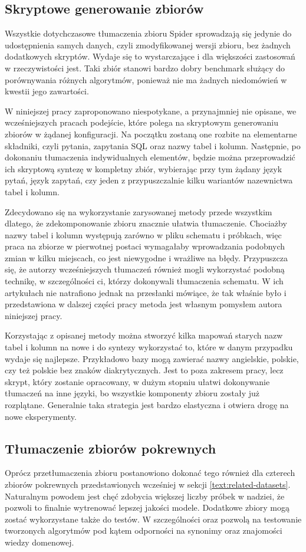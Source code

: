\subsection{Skryptowe generowanie zbiorów}
Wszystkie dotychczasowe tłumaczenia zbioru Spider sprowadzają się jedynie do udostępnienia samych danych, czyli zmodyfikowanej wersji zbioru, bez żadnych dodatkowych skryptów. Wydaje się to wystarczające i dla większości zastosowań w rzeczywistości jest. Taki zbiór stanowi bardzo dobry benchmark służący do porównywania różnych algorytmów, ponieważ nie ma żadnych niedomówień w kwestii jego zawartości.

W niniejszej pracy zaproponowano niespotykane, a przynajmniej nie opisane, we wcześniejszych pracach podejście, które polega na skryptowym generowaniu zbiorów w żądanej konfiguracji. Na początku zostaną one rozbite na elementarne składniki, czyli pytania, zapytania SQL oraz nazwy tabel i kolumn. Następnie, po dokonaniu tłumaczenia indywidualnych elementów, będzie można przeprowadzić ich skryptową syntezę w kompletny zbiór, wybierając przy tym żądany język pytań, język zapytań, czy jeden z przypuszczalnie kilku wariantów nazewnictwa tabel i kolumn. 

Zdecydowano się na wykorzystanie zarysowanej metody przede wszystkim dlatego, że zdekomponowanie zbioru znacznie ułatwia tłumaczenie. Chociażby nazwy tabel i kolumn występują zarówno w pliku schematu i próbkach, więc praca na zbiorze w pierwotnej postaci wymagałaby wprowadzania podobnych zmian w kilku miejscach, co jest niewygodne i wrażliwe na błędy. Przypuszcza się, że autorzy wcześniejszych tłumaczeń również mogli wykorzystać podobną technikę, w szczególności ci, którzy dokonywali tłumaczenia schematu. W ich artykułach nie natrafiono jednak na przesłanki mówiące, że tak właśnie było i przedstawiona w dalszej części pracy metoda jest własnym pomysłem autora niniejszej pracy.

Korzystając z opisanej metody można stworzyć kilka mapowań starych nazw tabel i kolumn na nowe i do syntezy wykorzystać to, które w danym przypadku wydaje się najlepsze. Przykładowo bazy mogą zawierać nazwy angielskie, polskie, czy też polskie bez znaków diakrytycznych. Jest to poza zakresem pracy, lecz skrypt, który zostanie opracowany, w dużym stopniu ułatwi dokonywanie tłumaczeń na inne języki, bo wszystkie komponenty zbioru  zostały już rozplątane. Generalnie taka strategia jest bardzo elastyczna i otwiera drogę na nowe eksperymenty.

\subsection{Tłumaczenie zbiorów pokrewnych}
Oprócz przetłumaczenia zbioru  postanowiono dokonać tego również dla czterech zbiorów pokrewnych przedstawionych wcześniej w sekcji \ref{text:related-datasets}. Naturalnym powodem jest chęć zdobycia większej liczby próbek w nadziei, że pozwoli to finalnie wytrenować lepszej jakości modele. Dodatkowe zbiory mogą zostać wykorzystane także do testów. W szczególności  oraz  pozwolą na testowanie tworzonych algorytmów pod kątem odporności na synonimy oraz znajomości wiedzy domenowej. 

